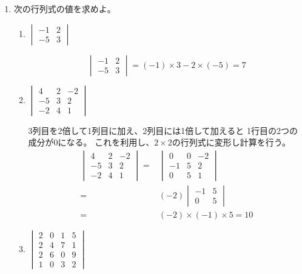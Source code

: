 \documentclass[10pt,a4paper]{ltjsarticle}
\begin{document}
\begin{enumerate}
 \item 次の行列式の値を求めよ。
       \begin{enumerate}
        \item $\begin{vmatrix} -1 & 2\\-5 & 3 \end{vmatrix}$

              \dotfill

              \begin{equation}
               \begin{vmatrix} -1 & 2\\-5 & 3 \end{vmatrix}
               = (-1)\times 3 - 2\times (-5)
                = 7
              \end{equation}

              \hrulefill
        \item $\begin{vmatrix} 4 & 2 & -2\\-5 & 3 & 2\\-2 & 4 & 1 \end{vmatrix}$

              \dotfill

              3列目を2倍して1列目に加え、2列目には1倍して加えると
              1行目の2つの成分が0になる。
              これを利用し、$2\times 2$の行列式に変形し計算を行う。
              \begin{align}
               \begin{vmatrix} 4 & 2 & -2\\-5 & 3 & 2\\-2 & 4 & 1 \end{vmatrix}
               =&\begin{vmatrix} 0 & 0 & -2\\-1 & 5 & 2\\0 & 5 & 1 \end{vmatrix}\\
               =& (-2)\begin{vmatrix} -1 & 5\\0 & 5 \end{vmatrix}\\
               =& (-2)\times (-1) \times 5 = 10
              \end{align}

              \hrulefill
        \item $\begin{vmatrix}
               2 & 0 & 1 & 5\\
               2 & 4 & 7 & 1\\
               2 & 6 & 0 & 9\\
               1 & 0 & 3 & 2
               \end{vmatrix}$


\end{enumerate}
\end{enumerate}
\end{document}
